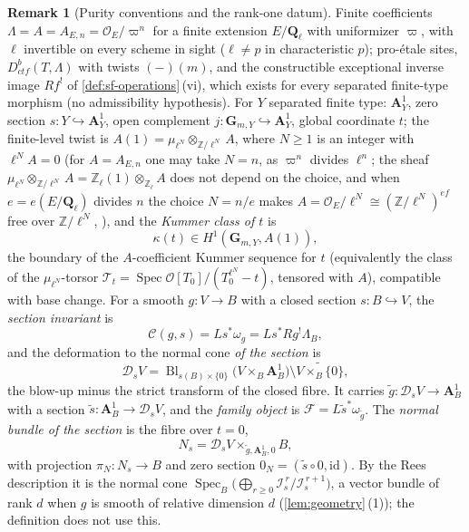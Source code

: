 \documentclass[11pt]{article}
\theoremstyle{plain}
\theoremstyle{definition}
\newtheorem{remark}[theorem]{Remark}
\newcommand{\Z}{\mathbb Z}
\newcommand{\Aaf}{\mathbf A}
\DeclareMathOperator{\Spec}{Spec}
\newcommand{\Cref}[1]{\hyperref[#1]{\ref{#1}}\,\hyperref[#1]{\nameref*{#1}}}
\begin{document}
\begin{remark}[Purity conventions and the rank-one datum]
\label{def:purity-conv}
Finite coefficients $\Lambda=A=A_{E,n}=\mathcal O_E/\varpi^n$ for a finite
extension $E/\mathbf Q_\ell$ with uniformizer $\varpi$, with $\ell$ invertible on
every scheme in sight ($\ell\ne p$ in characteristic $p$); pro-\'etale sites,
$D^b_{ctf}(T,\Lambda)$ with twists $(-)(m)$, and the constructible exceptional
inverse image $Rf^{!}$ of \Cref{def:sf-operations}(vi), which exists for every
separated finite-type morphism (no admissibility hypothesis).  For $Y$ separated finite type: $\Aaf^1_Y$, zero section
$s:Y\hookrightarrow\Aaf^1_Y$, open complement
$j:\mathbf G_{m,Y}\hookrightarrow\Aaf^1_Y$, global coordinate $t$; the
finite-level twist is $A(1)=\mu_{\ell^N}\otimes_{\Z/\ell^N}A$, where
$N\ge1$ is an integer with $\ell^NA=0$ (for $A=A_{E,n}$ one may take $N=n$,
as $\varpi^n$ divides $\ell^n$; the sheaf
$\mu_{\ell^N}\otimes_{\Z/\ell^N}A=\Z_\ell(1)\otimes_{\Z_\ell}A$ does not depend
on the choice, and when $e=e(E/\mathbf Q_\ell)$ divides $n$ the choice
$N=n/e$ makes $A=\mathcal O_E/\ell^N\cong(\Z/\ell^N)^{ef}$ free over
$\Z/\ell^N$, ), and the
\emph{Kummer class of $t$} is
\[
\kappa(t)\in H^1(\mathbf G_{m,Y},A(1)),
\]
the boundary of the $A$-coefficient Kummer sequence for $t$
(equivalently the class of the $\mu_{\ell^N}$-torsor
$\mathcal T_t=\Spec\mathcal O[T_0]/(T_0^{\ell^N}-t)$, tensored with $A$),
compatible with base change.  For a smooth
$g:V\to B$ with a closed section $s:B\hookrightarrow V$, the \emph{section
invariant} is
\[
\mathcal C(g,s)=Ls^{*}\omega_g=Ls^{*}Rg^{!}\Lambda_B ,
\]
and the deformation to the normal cone \emph{of the section} is
\[
\mathcal D_sV=\operatorname{Bl}_{s(B)\times\{0\}}
\bigl(V\times_B\Aaf^1_B\bigr)\setminus\widetilde{V\times_B\{0\}},
\]
the blow-up minus the strict transform of the closed fibre.  It carries
$\widetilde g:\mathcal D_sV\to\Aaf^1_B$ with a section
$\widetilde s:\Aaf^1_B\to\mathcal D_sV$, and the \emph{family object} is
$\mathcal F=L\widetilde s^{*}\omega_{\widetilde g}$.  The \emph{normal bundle of
the section} is the fibre over $t=0$,
\[
N_s=\mathcal D_sV\times_{\widetilde g,\Aaf^1_B,0}B,
\]
with projection $\pi_N:N_s\to B$ and zero section
$0_N=(\widetilde s\circ0,\mathrm{id})$.  By the Rees description it is the normal
cone $\Spec_B\bigl(\bigoplus_{r\ge0}\mathcal I_s^{\,r}/\mathcal I_s^{\,r+1}\bigr)$, a
vector bundle of rank $d$ when $g$ is smooth of relative dimension $d$
(\Cref{lem:geometry}(1)); the definition does not use this.
\end{remark}
\end{document}
